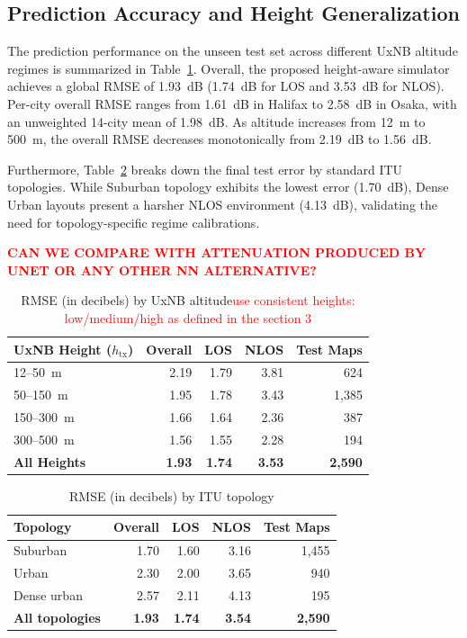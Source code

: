 \documentclass[10pt,conference,letterpaper]{IEEEtran}
\begin{document}
\subsection{Prediction Accuracy and Height Generalization}
The prediction performance on the unseen test set across different UxNB altitude regimes is summarized in Table~\ref{tab:height}. Overall, the proposed height-aware simulator achieves a global RMSE of \SI{1.93}{dB} (\SI{1.74}{dB} for LOS and \SI{3.53}{dB} for NLOS). Per-city overall RMSE ranges from \SI{1.61}{dB} in Halifax to \SI{2.58}{dB} in Osaka, with an unweighted 14-city mean of \SI{1.98}{dB}. As altitude increases from \SI{12}{m} to \SI{500}{m}, the overall RMSE decreases monotonically from \SI{2.19}{dB} to \SI{1.56}{dB}. 

Furthermore, Table~\ref{tab:itu-topology} breaks down the final test error by standard ITU topologies. While Suburban topology exhibits the lowest error (\SI{1.70}{dB}), Dense Urban layouts present a harsher NLOS environment (\SI{4.13}{dB}), validating the need for topology-specific regime calibrations.

\textcolor{red}{\textbf{CAN WE COMPARE WITH ATTENUATION PRODUCED BY UNET OR ANY OTHER NN ALTERNATIVE?}}

\begin{table}
\centering
\caption{RMSE (in decibels) by UxNB altitude\textcolor{red}{use consistent heights: low/medium/high as defined in the section 3}}
\label{tab:height}
\scriptsize
\begin{tabular}{lrrrr}
\toprule
UxNB Height ($h_{\text{tx}}$) & Overall & LOS & NLOS & Test Maps \\
\midrule
12--50~m & 2.19 & 1.79 & 3.81 & 624 \\
50--150~m & 1.95 & 1.78 & 3.43 & 1,385 \\
150--300~m & 1.66 & 1.64 & 2.36 & 387 \\
300--500~m & 1.56 & 1.55 & 2.28 & 194 \\
\midrule
\textbf{All Heights} & \textbf{1.93} & \textbf{1.74} & \textbf{3.53} & \textbf{2,590} \\
\bottomrule
\end{tabular}
\end{table}

\begin{table}
\centering
\caption{RMSE (in decibels) by ITU topology}
\label{tab:itu-topology}
\scriptsize
\begin{tabular}{lrrrr}
\toprule
Topology  & Overall & LOS & NLOS & Test Maps \\
\midrule
Suburban & 1.70 & 1.60 & 3.16 & 1,455\\
Urban & 2.30 & 2.00 & 3.65 & 940\\
Dense urban & 2.57 & 2.11 & 4.13 & 195\\
\midrule
\textbf{All topologies} & \textbf{1.93} & \textbf{1.74} & \textbf{3.54} &\textbf{2,590}\\
\bottomrule
\end{tabular}
\end{table}
\end{document}
